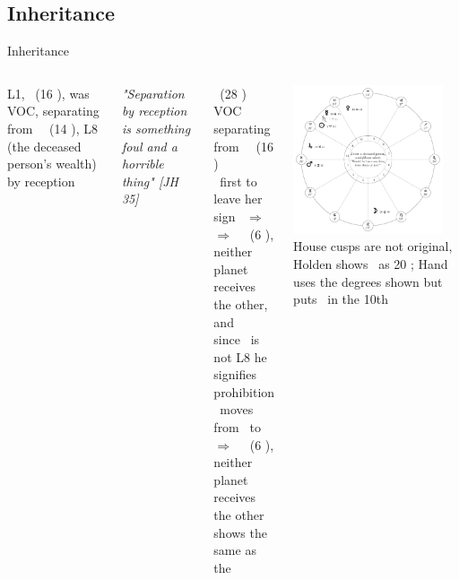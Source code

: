 \subsection{Inheritance}
\begin{frame}[t]{Inheritance}
\begin{columns}[T, onlytextwidth]
L1, \Venus\ (16 \Aquarius), was VOC, separating from \Square\  \Jupiter\ (14 \Taurus), L8 (the deceased person's wealth) by reception
\begin{block}{}
\textsl{"Separation by reception is something foul and a horrible thing" [JH 35]}
\end{block}
\Moon\ (28 \Leo) VOC separating from \Opposition\ \Venus\ (16 \Aquarius) \\
\Moon\ first to leave her sign \Leo\ $\Rightarrow$ \Virgo \\
$\Rightarrow$ \Trine\ \Mars\ (6 \Taurus), neither planet receives the other, and \\
since \Mars\ is not L8 he signifies prohibition \\
\vspace{0.25cm}
\Venus\ moves from \Aquarius\ to \Pisces \\
$\Rightarrow$ \Sextile\ \Mars\ (6 \Taurus), neither planet receives the other \\
shows the same as the \Moon

\begin{center}
{\includegraphics[width=0.9\textwidth]{charts/40-chart-inheritance}} \\
\small
House cusps are not original, Holden shows \Mercury\ as 20 \Pisces; Hand uses the degrees shown but puts \Mercury\ in the 10th
\end{center}
\end{columns}
\end{frame}